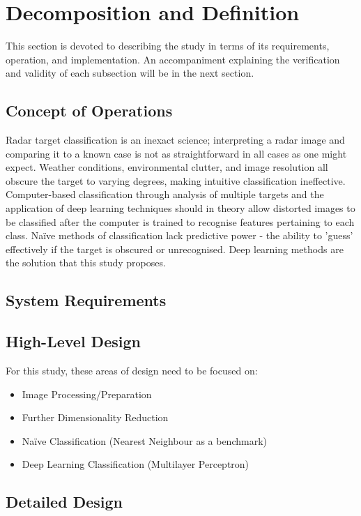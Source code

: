 \section{Decomposition and Definition}
This section is devoted to describing the study in terms of its requirements, operation, and implementation. An accompaniment explaining the verification and validity of each subsection will be in the next section.
\subsection{Concept of Operations}
Radar target classification is an inexact science; interpreting a radar image and comparing it to a known case is not as straightforward in all cases as one might expect. Weather conditions, environmental clutter, and image resolution all obscure the target to varying degrees, making intuitive classification ineffective. Computer-based classification through analysis of multiple targets and the application of deep learning techniques should in theory allow distorted images to be classified after the computer is trained to recognise features pertaining to each class. Na{\"i}ve methods of classification lack predictive power - the ability to 'guess' effectively if the target is obscured or unrecognised. Deep learning methods are the solution that this study proposes.

\subsection{System Requirements}
\subsection{High-Level Design}
For this study, these areas of design need to be focused on:

\begin{itemize}
	\item Image Processing/Preparation
	\item Further Dimensionality Reduction
	\item Na{\"i}ve Classification (Nearest Neighbour as a benchmark)
	\item Deep Learning Classification (Multilayer Perceptron)
\end{itemize}



\subsection{Detailed Design}
